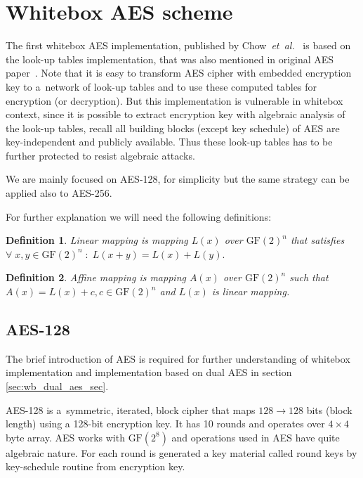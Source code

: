 \documentclass[11pt,oneside,final]{fithesis2}
\newtheorem{mydef}{Definition}
\newcommand{\gfe}{\ensuremath{\text{GF}\left(2^8\right)}}
\newcommand{\eal}{\emph{et~al.}}
\begin{document}
    \section{Whitebox AES scheme}

    The first whitebox AES implementation, published by Chow~\eal~\citep{Chow02white-boxcryptography} is based on the look-up tables implementation, that was also
    mentioned in original AES paper~\citep{2002-daemen}. Note that it is easy to transform AES cipher with embedded encryption key 
    to a~network of look-up tables and to use these computed tables for encryption (or decryption). But this implementation is vulnerable in whitebox context,
    since it is possible to extract encryption key with algebraic analysis of the look-up tables, recall all building blocks (except key schedule) of AES are key-independent 
    and publicly available. Thus these look-up tables has to be further protected to resist algebraic attacks. 
    
    We are mainly focused on AES-128, for simplicity but the same strategy can be applied also to AES-256.

    For further explanation we will need the following definitions:

    \begin{mydef}\label{def:linear_mapping}
    Linear mapping is mapping $L\left(x\right)$ over $\text{GF}(2)^n$ that satisfies $\forall \; x,y \in \text{GF}(2)^n \; : \; L(x+y) = L(x) + L(y).$
    \end{mydef}
    
    \begin{mydef}\label{def:affine_mapping}
    Affine mapping is mapping $A(x)$ over $\text{GF}(2)^n$ such that $A(x) = L(x) + c, c \in \text{GF}(2)^n$ and $L(x)$ is linear mapping.
    \end{mydef}

    \subsection{AES-128}
    The brief introduction of AES is required for further understanding of whitebox implementation and implementation based on dual AES in section \ref{sec:wb_dual_aes_sec}.
    
    AES-128 is a~symmetric, iterated, block cipher that maps $128 \rightarrow 128$ bits (block length) using a 128-bit encryption key. It has 10 rounds and operates
    over $4\times4$ byte array. AES works with $\gfe$ and operations used in AES have quite algebraic nature. For each round is generated a key material called round keys
    by key-schedule routine from encryption key. 
    
\end{document}
